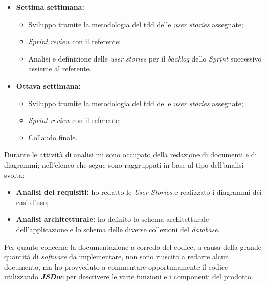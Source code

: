 \begin{itemize}
\begin{itemize}
    \end{itemize}
  \item \textbf{Settima settimana:} 
    \begin{itemize}
      \item Sviluppo tramite la metodologia del \acrshort{tdd} delle \emph{user stories} assegnate;
      \item \emph{Sprint review} con il referente;
      \item Analisi e definizione delle \emph{user stories} per il \emph{backlog} dello \emph{Sprint} successivo assieme al referente.
    \end{itemize}
  \item \textbf{Ottava settimana:} 
    \begin{itemize}
      \item Sviluppo tramite la metodologia del \acrshort{tdd} delle \emph{user stories} assegnate;
      \item \emph{Sprint review} con il referente;
      \item Collaudo finale.
    \end{itemize}
\end{itemize}

Durante le attività di analisi mi sono occupato della redazione di documenti e di diagrammi; nell'elenco che segue sono raggruppati in base al tipo dell'analisi svolta:
\begin{itemize}
  \item \textbf{Analisi dei requisiti:} ho redatto le \emph{User Stories} e realizzato i diagrammi dei casi d'uso;
  \item \textbf{Analisi architetturale:} ho definito lo schema architetturale dell'applicazione e lo schema delle diverse collezioni del \emph{database}.
\end{itemize}

Per quanto concerne la documentazione a corredo del codice, a causa della grande quantità di \emph{software} da implementare, non sono riuscito a redarre alcun documento, ma ho provveduto a commentare opportunamente il codice utilizzando \emph{\textbf{JSDoc}} per descrivere le varie funzioni e i componenti del prodotto.